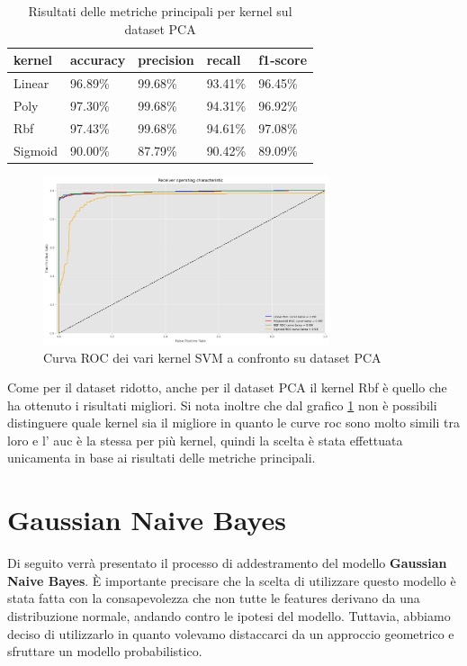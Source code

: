     \begin{table}[!ht]
        \centering
        \begin{tabular}{|l|l|l|l|l|}
        \hline
            \textbf{kernel} & \textbf{accuracy} & \textbf{precision} & \textbf{recall} & \textbf{f1-score} \\ \hline
            Linear & 96.89\% & 99.68\% & 93.41\% & 96.45\%  \\ \hline
            Poly & 97.30\% & 99.68\% & 94.31\% & 96.92\%  \\ \hline
            Rbf & 97.43\% & 99.68\% & 94.61\% & 97.08\%  \\ \hline
            Sigmoid & 90.00\% & 87.79\% & 90.42\% & 89.09\%  \\ \hline
        \end{tabular}
        \caption{Risultati delle metriche principali per kernel sul dataset PCA}
        \label{tab:top_metrics_kernels_pca}
    \end{table}

    \begin{figure}[!ht]
        \centering
        \includegraphics[width=0.75\textwidth]{img/svm/SVM_roc_pca.png}
        \caption{Curva ROC dei vari kernel SVM a confronto su dataset PCA}
        \label{fig:roc_SVM_PCA}
    \end{figure}

    Come per il dataset ridotto, anche per il dataset PCA il kernel Rbf 
    è quello che ha ottenuto i risultati migliori. Si nota inoltre che dal 
    grafico \ref{fig:roc_SVM_PCA} non è possibili distinguere quale kernel sia
    il migliore in quanto le curve roc sono molto simili tra loro e l' auc è la
    stessa per più kernel, quindi la scelta è stata effettuata unicamenta in base
    ai risultati delle metriche principali. 

\newpage

\section{Gaussian Naive Bayes}
Di seguito verrà presentato il processo di addestramento del modello
\textbf{Gaussian Naive Bayes}. È importante precisare che la scelta di utilizzare
questo modello è stata fatta con la consapevolezza che non tutte le features
derivano da una distribuzione normale, andando contro le ipotesi del modello.
Tuttavia, abbiamo deciso di utilizzarlo in quanto volevamo distaccarci da un
approccio geometrico e sfruttare un modello probabilistico.
